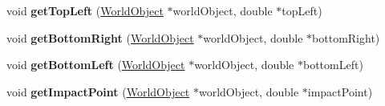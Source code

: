 \begin{DoxyCompactItemize}
\item 
void {\bfseries get\+Top\+Left} (\hyperlink{class_world_object}{World\+Object} $\ast$world\+Object, double $\ast$top\+Left)\hypertarget{class_physics_calc_a518d1c85e39c54bd349e02659c92b134}{}\label{class_physics_calc_a518d1c85e39c54bd349e02659c92b134}

\item 
void {\bfseries get\+Bottom\+Right} (\hyperlink{class_world_object}{World\+Object} $\ast$world\+Object, double $\ast$bottom\+Right)\hypertarget{class_physics_calc_af118ca721ecccebab2c88e53b7471320}{}\label{class_physics_calc_af118ca721ecccebab2c88e53b7471320}

\item 
void {\bfseries get\+Bottom\+Left} (\hyperlink{class_world_object}{World\+Object} $\ast$world\+Object, double $\ast$bottom\+Left)\hypertarget{class_physics_calc_a9a74039e739a8649547c6d2f8aaf7fab}{}\label{class_physics_calc_a9a74039e739a8649547c6d2f8aaf7fab}

\item 
void {\bfseries get\+Impact\+Point} (\hyperlink{class_world_object}{World\+Object} $\ast$world\+Object, double $\ast$impact\+Point)\hypertarget{class_physics_calc_a9bbfe3998836451d84697577c0e6195d}{}\label{class_physics_calc_a9bbfe3998836451d84697577c0e6195d}


\end{DoxyCompactItemize}
